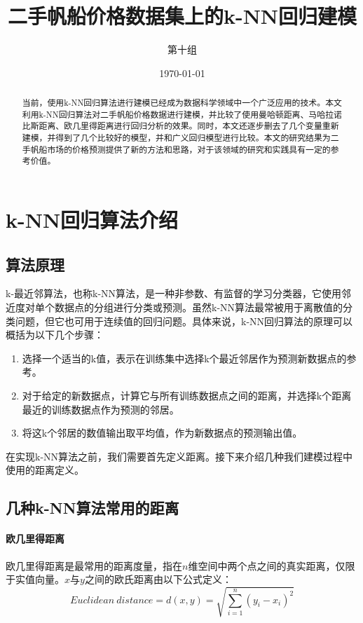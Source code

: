 \documentclass[a4paper,12pt,onecolumn,oneside]{article}
\title{二手帆船价格数据集上的k-NN回归建模}
\author{第十组}
\date{\today}
\begin{document}
	\maketitle
	
\begin{abstract}
	当前，使用k-NN回归算法进行建模已经成为数据科学领域中一个广泛应用的技术。本文利用k-NN回归算法对二手帆船价格数据进行建模，并比较了使用曼哈顿距离、马哈拉诺比斯距离、欧几里得距离进行回归分析的效果。同时，本文还逐步删去了几个变量重新建模，并得到了几个比较好的模型，并和广义回归模型进行比较。本文的研究结果为二手帆船市场的价格预测提供了新的方法和思路，对于该领域的研究和实践具有一定的参考价值。
\end{abstract}

	\tableofcontents
	\clearpage
	\section{k-NN回归算法介绍}
	
	\subsection{算法原理}
	k-最近邻算法，也称k-NN算法，是一种非参数、有监督的学习分类器，它使用邻近度对单个数据点的分组进行分类或预测。虽然k-NN算法最常被用于离散值的分类问题，但它也可用于连续值的回归问题。具体来说，k-NN回归算法的原理可以概括为以下几个步骤：
	\begin{enumerate}
		\item 选择一个适当的k值，表示在训练集中选择k个最近邻居作为预测新数据点的参考。
		\item 对于给定的新数据点，计算它与所有训练数据点之间的距离，并选择k个距离最近的训练数据点作为预测的邻居。
		\item 将这k个邻居的数值输出取平均值，作为新数据点的预测输出值。
	\end{enumerate}
	在实现k-NN算法之前，我们需要首先定义距离。接下来介绍几种我们建模过程中使用的距离定义。
	
	\subsection{几种k-NN算法常用的距离}
	\paragraph{欧几里得距离} 欧几里得距离是最常用的距离度量，指在$n$维空间中两个点之间的真实距离，仅限于实值向量。$x$与$y$之间的欧氏距离由以下公式定义：
	\begin{equation*}
		Euclidean~distance = d(x,y) = \sqrt{\sum_{i=1}^{n}(y_i-x_i)^2}
	\end{equation*}
\end{document}

